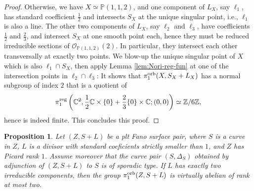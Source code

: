 \documentclass{amsart}
\newcommand{\pp}{\mathbb{P}}
\newcommand{\zz}{\mathbb{Z}}
\newcommand{\cc}{\mathbb{C}}
\newtheorem{proposition}[theorem]{Proposition}
\theoremstyle{definition}
\theoremstyle{remark}
\numberwithin{equation}{section}
\begin{document}
\begin{proof}
Otherwise, we have $X\simeq\pp(1,1,2)$, and one component of $L_X$, say $\ell_1$, has standard coefficient $\frac{1}{2}$ and intersects $S_X$ at the unique singular point, i.e., $\ell_1$ is also a line. The other two components of $L_X$, say $\ell_2$ and $\ell_3$, have coefficients $\frac{1}{2}$ and $\frac{2}{3}$, and intersect $S_X$ at one smooth point each, hence they must be reduced irreducible sections of $\mathcal{O}_{\pp(1,1,2)}(2)$. In particular, they intersect each other transversally at exactly two points. We blow-up the unique singular point of $X$ which is also $\ell_1\cap S_X$, then apply Lemma \ref{lem:Nori-reg-fun} at one of the intersection points in $\ell_2\cap \ell_3$: It shows that $\pi_1^{\rm orb}(X,S_X+L_X)$ has a normal subgroup of index $2$ that is a quotient of 
$$\pi_1^{\rm reg}\left(\cc^2,\frac{1}{2}\cc\times \{0\} + \frac{2}{3}\{0\}\times \cc;(0,0)\right)\simeq \zz/6\zz,$$
hence is indeed finite. This concludes this proof.
\end{proof}


\begin{proposition}\label{prop:toric-fund-group-2comps}
Let $(Z,S+L)$ be a plt Fano surface pair, where
$S$ is a curve in $Z$, $L$ is a divisor with standard coeficients strictly smaller than $1$, and $Z$ has Picard rank $1$. Assume moreover 
that the curve pair $(S,\Delta_S)$ obtained by adjunction of $(Z,S+L)$ to $S$ is of sporadic type.
If $L$ has exactly two irreducible components, then the group $\pi_1^{\rm orb}(Z,S+L)$ is virtually abelian of rank at most two.
\end{proposition}
\end{document}

